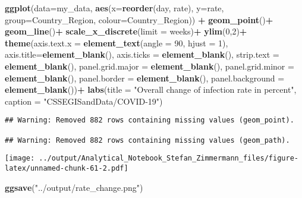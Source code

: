 \documentclass[]{article}
\newenvironment{Shaded}{\begin{snugshade}}{\end{snugshade}}
\newcommand{\DataTypeTok}[1]{\textcolor[rgb]{0.13,0.29,0.53}{#1}}
\newcommand{\DecValTok}[1]{\textcolor[rgb]{0.00,0.00,0.81}{#1}}
\newcommand{\KeywordTok}[1]{\textcolor[rgb]{0.13,0.29,0.53}{\textbf{#1}}}
\newcommand{\NormalTok}[1]{#1}
\newcommand{\OperatorTok}[1]{\textcolor[rgb]{0.81,0.36,0.00}{\textbf{#1}}}
\newcommand{\StringTok}[1]{\textcolor[rgb]{0.31,0.60,0.02}{#1}}
\begin{document}
\begin{Shaded}
\begin{Highlighting}[]
\KeywordTok{ggplot}\NormalTok{(}\DataTypeTok{data=}\NormalTok{my_data, }\KeywordTok{aes}\NormalTok{(}\DataTypeTok{x=}\KeywordTok{reorder}\NormalTok{(day, rate), }\DataTypeTok{y=}\NormalTok{rate, }\DataTypeTok{group=}\NormalTok{Country_Region, }\DataTypeTok{colour=}\NormalTok{Country_Region)) }\OperatorTok{+}
\StringTok{  }\KeywordTok{geom_point}\NormalTok{()}\OperatorTok{+}
\StringTok{  }\KeywordTok{geom_line}\NormalTok{()}\OperatorTok{+}
\StringTok{  }\KeywordTok{scale_x_discrete}\NormalTok{(}\DataTypeTok{limit =}\NormalTok{ weeks)}\OperatorTok{+}
\StringTok{  }\KeywordTok{ylim}\NormalTok{(}\DecValTok{0}\NormalTok{,}\DecValTok{2}\NormalTok{)}\OperatorTok{+}
\StringTok{  }\KeywordTok{theme}\NormalTok{(}\DataTypeTok{axis.text.x =} \KeywordTok{element_text}\NormalTok{(}\DataTypeTok{angle =} \DecValTok{90}\NormalTok{, }\DataTypeTok{hjust =} \DecValTok{1}\NormalTok{),}
        \DataTypeTok{axis.title=}\KeywordTok{element_blank}\NormalTok{(),}
        \DataTypeTok{axis.ticks =} \KeywordTok{element_blank}\NormalTok{(),}
        \DataTypeTok{strip.text =} \KeywordTok{element_blank}\NormalTok{(),}
        \DataTypeTok{panel.grid.major =} \KeywordTok{element_blank}\NormalTok{(), }
        \DataTypeTok{panel.grid.minor =} \KeywordTok{element_blank}\NormalTok{(), }
        \DataTypeTok{panel.border =} \KeywordTok{element_blank}\NormalTok{(), }
        \DataTypeTok{panel.background =} \KeywordTok{element_blank}\NormalTok{())}\OperatorTok{+}
\StringTok{ }\KeywordTok{labs}\NormalTok{(}\DataTypeTok{title =}  \StringTok{"Overall change of infection rate in percent"}\NormalTok{,}
       \DataTypeTok{caption =} \StringTok{"CSSEGISandData/COVID-19"}\NormalTok{)}
\end{Highlighting}
\end{Shaded}

\begin{verbatim}
## Warning: Removed 882 rows containing missing values (geom_point).

## Warning: Removed 882 rows containing missing values (geom_path).
\end{verbatim}

\texttt{[image: ../output/Analytical\_Notebook\_Stefan\_Zimmermann\_files/figure-latex/unnamed-chunk-61-2.pdf]}

\begin{Shaded}
\begin{Highlighting}[]
\KeywordTok{ggsave}\NormalTok{(}\StringTok{"../output/rate_change.png"}\NormalTok{)}
\end{Highlighting}
\end{Shaded}
\end{document}

